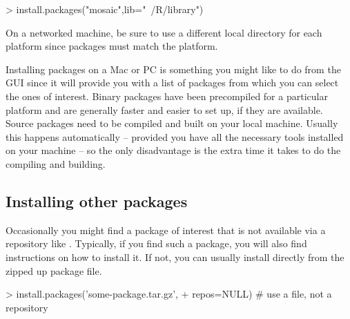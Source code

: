 \begin{Schunk}
\begin{Sinput}
> install.packages("mosaic",lib="~/R/library")
\end{Sinput}
\end{Schunk}
On a networked machine, be sure to use a different local directory for 
each platform since packages must match the platform.

Installing  packages on a Mac or PC is something you might like to do 
from the GUI since it will provide you with a list of packages from 
which you can select the ones of interest.
Binary packages have been precompiled for a 
particular platform and are generally faster and easier to set up, if they 
are available.  Source packages need to be compiled and built on your local
machine.  Usually this happens automatically -- provided you have all the 
necessary tools installed on your machine -- so the only disadvantage is the
extra time it takes to do the compiling and building.

\subsection{Installing other packages}

Occasionally you might find a package of interest that is not available via
a repository like \cran.  
Typically, if you find such a package, you will also find instructions
on how to install it.  If not, you can usually install directly from the 
zipped up package file.

\begin{Schunk}
\begin{Sinput}
> install.packages('some-package.tar.gz', 
+                   repos=NULL)           # use a file, not a repository
\end{Sinput}
\end{Schunk}



